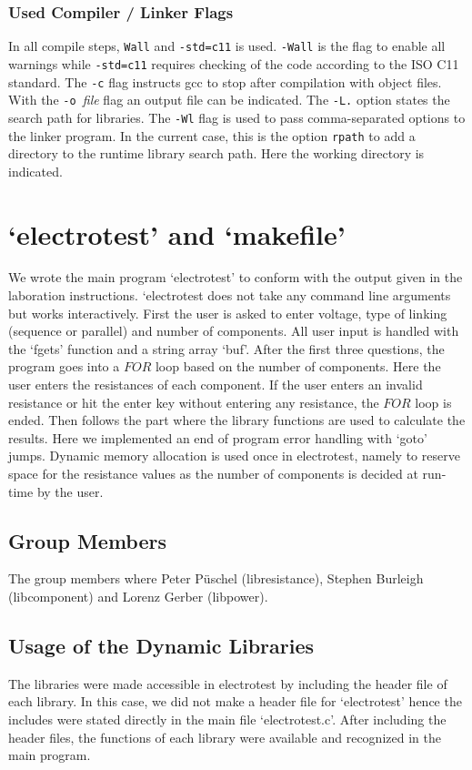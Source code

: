 \documentclass[a4paper,11pt,twoside]{article}
\begin{document}
\subsubsection{Used Compiler / Linker Flags}
In all compile steps, \verb+Wall+ and \verb+-std=c11+ is used. \verb+-Wall+ is the flag to enable all warnings while \verb+-std=c11+ requires checking of the code according to the ISO C11 standard. The \verb+-c+ flag instructs gcc to stop after compilation with object files. With the \verb+-o +\textit{file} flag an output file can be indicated. The \verb+-L.+ option states the search path for libraries. The \verb+-Wl+ flag is used to pass comma-separated options to the linker program. In the current case, this is the option \verb+rpath+ to add a directory to the runtime library search path. Here the working directory is indicated.
   
\section{`electrotest' and `makefile'}
We wrote the main program `electrotest' to conform with the output given in the laboration instructions. `electrotest does not take any command line arguments but works interactively. First the user is asked to enter voltage, type of linking (sequence or parallel) and number of components. All user input is handled with the `fgets' function and a string array `buf'. 
After the first three questions, the program goes into a $FOR$ loop based on the number of components. Here the user enters the resistances of each component. If the user enters an invalid resistance or hit the enter key without entering any resistance, the $FOR$ loop is ended. Then follows the part where the library functions are used to calculate the results. Here we implemented an end of program error handling with `goto' jumps.
Dynamic memory allocation is used once in electrotest, namely to reserve space for the resistance values as the number of components is decided at run-time by the user.   

\subsection{Group Members}
The group members where Peter Püschel (libresistance), Stephen Burleigh (libcomponent) and Lorenz Gerber (libpower). 

\subsection{Usage of the Dynamic Libraries}
The libraries were made accessible in electrotest by including the header file of each library. In this case, we did not make a header file for `electrotest' hence the includes were stated directly in the main file `electrotest.c'. After including the header files, the functions of each library were available and recognized in the main program.
\end{document}
